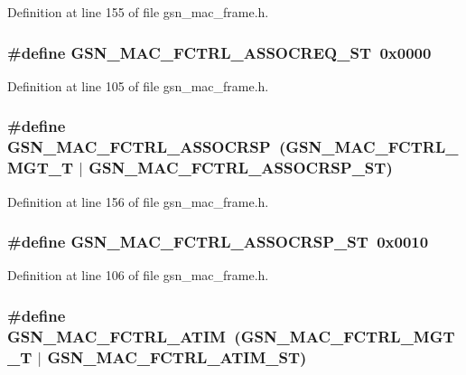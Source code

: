 Definition at line 155 of file gsn\_\-mac\_\-frame.h.

\hypertarget{a00523_ae23c91e40c93812cab3c45ea083a05d1}{
\subsubsection[{GSN\_\-MAC\_\-FCTRL\_\-ASSOCREQ\_\-ST}]{\setlength{\rightskip}{0pt plus 5cm}\#define GSN\_\-MAC\_\-FCTRL\_\-ASSOCREQ\_\-ST~0x0000}}
\label{a00523_ae23c91e40c93812cab3c45ea083a05d1}


Definition at line 105 of file gsn\_\-mac\_\-frame.h.

\hypertarget{a00523_ad79a011e47575c3e14ebdd21bbae832a}{
\subsubsection[{GSN\_\-MAC\_\-FCTRL\_\-ASSOCRSP}]{\setlength{\rightskip}{0pt plus 5cm}\#define GSN\_\-MAC\_\-FCTRL\_\-ASSOCRSP~(GSN\_\-MAC\_\-FCTRL\_\-MGT\_\-T     $|$ GSN\_\-MAC\_\-FCTRL\_\-ASSOCRSP\_\-ST)}}
\label{a00523_ad79a011e47575c3e14ebdd21bbae832a}


Definition at line 156 of file gsn\_\-mac\_\-frame.h.

\hypertarget{a00523_ac12ef43a52294a46ebdee5aa7ec8f2a1}{
\subsubsection[{GSN\_\-MAC\_\-FCTRL\_\-ASSOCRSP\_\-ST}]{\setlength{\rightskip}{0pt plus 5cm}\#define GSN\_\-MAC\_\-FCTRL\_\-ASSOCRSP\_\-ST~0x0010}}
\label{a00523_ac12ef43a52294a46ebdee5aa7ec8f2a1}


Definition at line 106 of file gsn\_\-mac\_\-frame.h.

\hypertarget{a00523_a8a475baf10ee0311404c95f5c7244c49}{
\subsubsection[{GSN\_\-MAC\_\-FCTRL\_\-ATIM}]{\setlength{\rightskip}{0pt plus 5cm}\#define GSN\_\-MAC\_\-FCTRL\_\-ATIM~(GSN\_\-MAC\_\-FCTRL\_\-MGT\_\-T     $|$ GSN\_\-MAC\_\-FCTRL\_\-ATIM\_\-ST)}}
\label{a00523_a8a475baf10ee0311404c95f5c7244c49}



